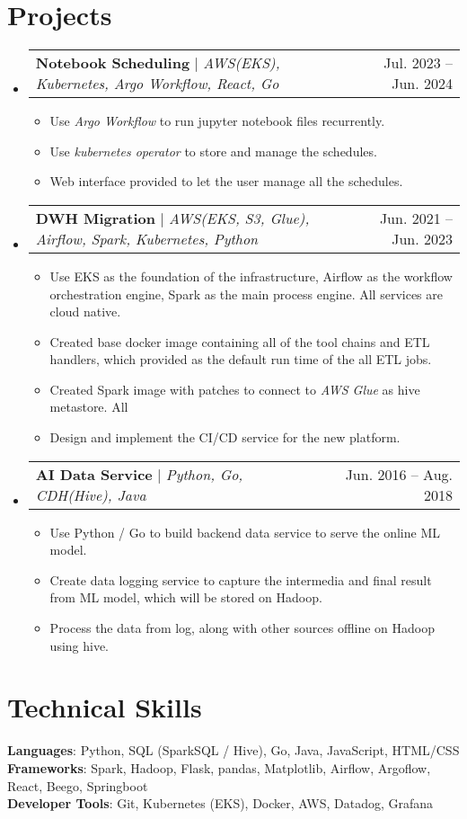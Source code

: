 \documentclass[a4paper,11pt]{article}
\makeatletter
\newcommand{\resumeItem}[1]{
  \item\small{
    {#1 \vspace{-2pt}}
  }
}
\newcommand{\resumeProjectHeading}[2]{
    \item
    \begin{tabular*}{0.97\textwidth}{l@{\extracolsep{\fill}}r}
      \small#1 & #2 \\
    \end{tabular*}\vspace{-7pt}
}
\newcommand{\resumeSubHeadingListStart}{\begin{itemize}[leftmargin=0.15in, label={}]}
\newcommand{\resumeSubHeadingListEnd}{\end{itemize}}
\newcommand{\resumeItemListStart}{\begin{itemize}}
\newcommand{\resumeItemListEnd}{\end{itemize}\vspace{-5pt}}
\makeatother
\begin{document}
\section{Projects}
    \resumeSubHeadingListStart
      \resumeProjectHeading
          {\textbf{Notebook Scheduling} $|$ \emph{AWS(EKS), Kubernetes, Argo Workflow, React, Go}}{Jul. 2023 -- Jun. 2024}
          \resumeItemListStart
            \resumeItem{Use \emph{Argo Workflow} to run jupyter notebook files recurrently.}
            \resumeItem{Use \emph{kubernetes operator} to store and manage the schedules.}
            \resumeItem{Web interface provided to let the user manage all the schedules.}
          \resumeItemListEnd
      \resumeProjectHeading
          {\textbf{DWH Migration} $|$ \emph{AWS(EKS, S3, Glue), Airflow, Spark, Kubernetes, Python}}{Jun. 2021 -- Jun. 2023}
          \resumeItemListStart
            \resumeItem{Use EKS as the foundation of the infrastructure, Airflow as the workflow orchestration engine, Spark as the main process engine. All services are cloud native.}
            \resumeItem{Created base docker image containing all of the tool chains and ETL handlers, which provided as the default run time of the all ETL jobs.}
            \resumeItem{Created Spark image with patches to connect to \emph{AWS Glue} as hive metastore. All }
            \resumeItem{Design and implement the CI/CD service for the new platform.}
          \resumeItemListEnd
      \resumeProjectHeading
          {\textbf{AI Data Service} $|$ \emph{Python, Go, CDH(Hive), Java}}{Jun. 2016 -- Aug. 2018}
          \resumeItemListStart
            \resumeItem{Use Python / Go to build backend data service to serve the online ML model.}
            \resumeItem{Create data logging service to capture the intermedia and final result from ML model, which will be stored on Hadoop.}
            \resumeItem{Process the data from log, along with other sources offline on Hadoop using hive.}
          \resumeItemListEnd
    \resumeSubHeadingListEnd


%
\section{Technical Skills}
 \begin{itemize}[leftmargin=0.15in, label={}]
    \small{\item{
     \textbf{Languages}{: Python, SQL (SparkSQL / Hive), Go, Java, JavaScript, HTML/CSS} \\
     \textbf{Frameworks}{: Spark, Hadoop, Flask, pandas, Matplotlib, Airflow, Argoflow, React, Beego, Springboot } \\
     \textbf{Developer Tools}{: Git, Kubernetes (EKS), Docker, AWS, Datadog, Grafana} \\
    }}
 \end{itemize}


\end{document}
